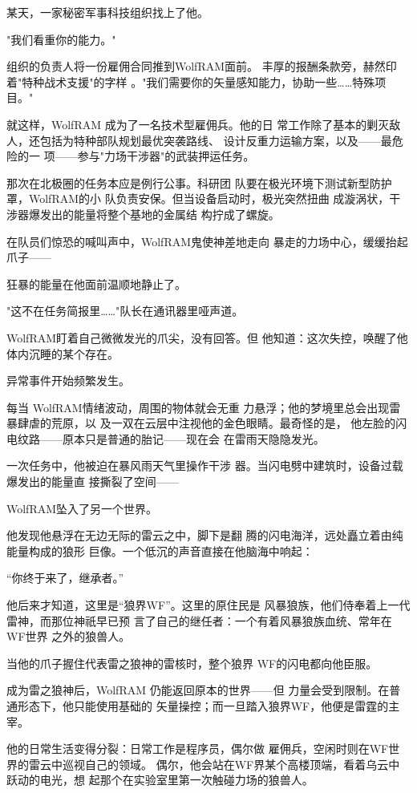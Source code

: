 \documentclass[lang=cn,newtx,10pt,scheme=chinese]{elegantbook}
\newcommand{\wf}{WolfRAM}
\begin{document}
某天，一家秘密军事科技组织找上了他。

"我们看重你的能力。"

组织的负责人将一份雇佣合同推到\wf{}面前。
丰厚的报酬条款旁，赫然印着"特种战术支援"的字样
。"我们需要你的矢量感知能力，协助一些……特殊项目。"

就这样，\wf{} 成为了一名技术型雇佣兵。他的日
常工作除了基本的剿灭敌人，还包括为特种部队规划最优突袭路线、
设计反重力运输方案，以及——最危险的一
项——参与"力场干涉器"的武装押运任务。

那次在北极圈的任务本应是例行公事。科研团
队要在极光环境下测试新型防护罩，\wf{}的小
队负责安保。但当设备启动时，极光突然扭曲
成漩涡状，干涉器爆发出的能量将整个基地的金属结
构拧成了螺旋。

在队员们惊恐的喊叫声中，\wf{}鬼使神差地走向
暴走的力场中心，缓缓抬起爪子——

狂暴的能量在他面前温顺地静止了。

"这不在任务简报里……"队长在通讯器里哑声道。

\wf{}盯着自己微微发光的爪尖，没有回答。但
他知道：这次失控，唤醒了他体内沉睡的某个存在。

异常事件开始频繁发生。

每当 \wf{}情绪波动，周围的物体就会无重
力悬浮；他的梦境里总会出现雷暴肆虐的荒原，以
及一双在云层中注视他的金色眼睛。最奇怪的是，
他左脸的闪电纹路——原本只是普通的胎记——现在会
在雷雨天隐隐发光。

一次任务中，他被迫在暴风雨天气里操作干涉
器。当闪电劈中建筑时，设备过载爆发出的能量直
接撕裂了空间——

\wf{}坠入了另一个世界。

他发现他悬浮在无边无际的雷云之中，脚下是翻
腾的闪电海洋，远处矗立着由纯能量构成的狼形
巨像。一个低沉的声音直接在他脑海中响起：

“你终于来了，继承者。”

他后来才知道，这里是“狼界WF”。这里的原住民是
风暴狼族，他们侍奉着上一代雷神，而那位神祇早已预
言了自己的继任者：一个有着风暴狼族血统、常年在WF世界
之外的狼兽人。

当他的爪子握住代表雷之狼神的雷核时，整个狼界
WF的闪电都向他臣服。

成为雷之狼神后，\wf{} 仍能返回原本的世界——但
力量会受到限制。在普通形态下，他只能使用基础的
矢量操控；而一旦踏入狼界WF，他便是雷霆的主宰。

他的日常生活变得分裂：日常工作是程序员，偶尔做
雇佣兵，空闲时则在WF世界的雷云中巡视自己的领域。
偶尔，他会站在WF界某个高楼顶端，看着乌云中跃动的电光，想
起那个在实验室里第一次触碰力场的狼兽人。
\end{document}
